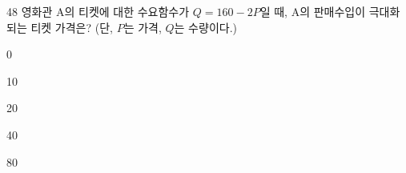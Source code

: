 \begin{question}{48}
영화관 A의 티켓에 대한 수요함수가 $Q=160-2P$일 때, A의 판매수입이 극대화되는 티켓 가격은? (단, $P$는 가격, $Q$는 수량이다.)
\begin{choices}
  \item 0
  \item 10
  \item 20
  \item 40
  \item 80
\end{choices}
\end{question}
